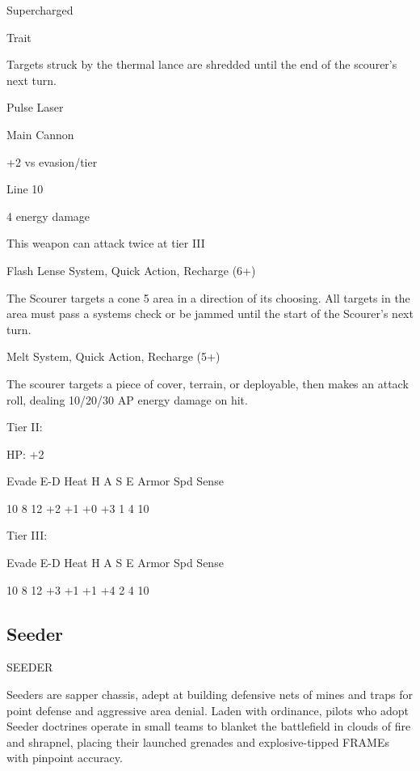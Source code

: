 Supercharged
 
Trait
 

                                                                                                         


Targets struck by the thermal lance are shredded until the end of the scourer’s next turn.
 

Pulse Laser
 
Main Cannon
 
+2 vs evasion/tier
 
Line 10
 
4 energy damage
 
This weapon can attack twice at tier III
 

Flash Lense  
System, Quick Action, Recharge (6+)
 
The Scourer targets a cone 5 area in a direction of its choosing. All targets in the area must pass  
a systems check or be jammed until the start of the Scourer’s next turn.
 

Melt  
System, Quick Action, Recharge (5+)
 
The scourer targets a piece of cover, terrain, or deployable, then makes an attack roll, dealing  
10/20/30 AP energy damage on hit.
 

Tier II:
 
HP: +2
 

          Evade    E-D    Heat     H    A     S     E       Armor        Spd      Sense 

          10       8      12       +2   +1    +0    +3      1            4        10 

Tier III:
 

          Evade    E-D    Heat     H    A     S     E       Armor        Spd      Sense 

          10       8      12       +3   +1    +1    +4      2            4        10 

                                                                                                                
\subsection{Seeder}

                                                SEEDER  

Seeders are sapper chassis, adept at building defensive nets of mines and traps for point defense  
and aggressive area denial. Laden with ordinance, pilots who adopt Seeder doctrines operate in  
small teams to blanket the battlefield in clouds of fire and shrapnel, placing their launched  
grenades and explosive-tipped FRAMEs with pinpoint accuracy. 
 

